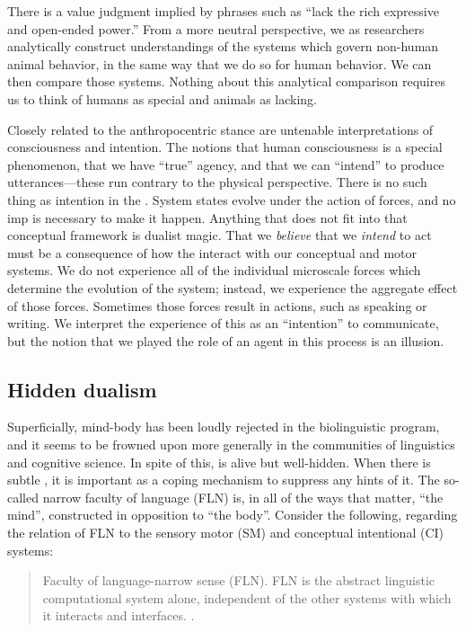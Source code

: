   There is a value judgment implied by phrases such as “lack the rich expressive and open-ended power.” From a more neutral perspective, we as researchers analytically construct understandings of the systems which govern non-human animal behavior, in the same way that we do so for human behavior. We can then compare those systems. Nothing about this analytical comparison requires us to think of humans as special and animals as lacking.

  Closely related to the anthropocentric stance are untenable interpretations of consciousness and intention. The notions that human consciousness is a special phenomenon, that we have “true” agency, and that we can “intend” to produce utterances—these run contrary to the physical perspective. There is no such thing as intention in the . System states evolve under the action of forces, and no imp is necessary to make it happen. Anything that does not fit into that conceptual framework is dualist magic. That we \textit{believe} that we \textit{intend} to act must be a consequence of how the  interact with our conceptual and motor systems. We do not experience all of the individual microscale forces which determine the evolution of the system; instead, we experience the aggregate effect of those forces. Sometimes those forces result in actions, such as speaking or writing. We interpret the experience of this as an “intention” to communicate, but the notion that we played the role of an agent in this process is an illusion.

\subsection{Hidden dualism}

Superficially, mind-body  has been loudly rejected in the biolinguistic program, and it seems to be frowned upon more generally in the communities of linguistics and cognitive science. In spite of this,  is alive but well-hidden. When there is subtle , it is important as a coping mechanism to suppress any hints of it. The so-called narrow faculty of language (FLN) is, in all of the ways that matter, “the mind”, constructed in opposition to “the body”. Consider the following, regarding the relation of FLN to the sensory motor (SM) and conceptual intentional (CI) systems:

\begin{quote}
Faculty of language-narrow sense (FLN). FLN is the abstract linguistic computational system alone, independent of the other systems with which it interacts and interfaces. \citep{HauserEtAl2002}.
\end{quote}

